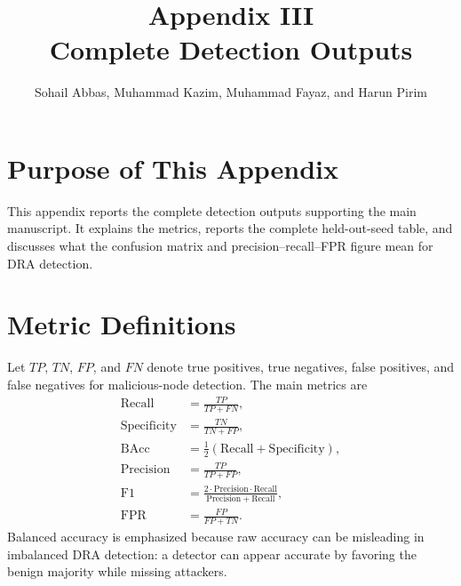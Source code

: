 \documentclass[10pt]{article}
\title{\vspace{-1.2cm}Appendix III\\Complete Detection Outputs}
\author{Sohail Abbas, Muhammad Kazim, Muhammad Fayaz, and Harun Pirim}
\date{}
\begin{document}
\maketitle

\section{Purpose of This Appendix}
This appendix reports the complete detection outputs supporting the main manuscript. It explains the metrics, reports the complete held-out-seed table, and discusses what the confusion matrix and precision--recall--FPR figure mean for DRA detection.

\section{Metric Definitions}
Let $TP$, $TN$, $FP$, and $FN$ denote true positives, true negatives, false positives, and false negatives for malicious-node detection. The main metrics are
\begin{align}
\mathrm{Recall} &= \frac{TP}{TP+FN},\\
\mathrm{Specificity} &= \frac{TN}{TN+FP},\\
\mathrm{BAcc} &= \frac{1}{2}(\mathrm{Recall}+\mathrm{Specificity}),\\
\mathrm{Precision} &= \frac{TP}{TP+FP},\\
\mathrm{F1} &= \frac{2\cdot \mathrm{Precision}\cdot \mathrm{Recall}}
{\mathrm{Precision}+\mathrm{Recall}},\\
\mathrm{FPR} &= \frac{FP}{FP+TN}.
\end{align}
Balanced accuracy is emphasized because raw accuracy can be misleading in imbalanced DRA detection: a detector can appear accurate by favoring the benign majority while missing attackers.
\end{document}
